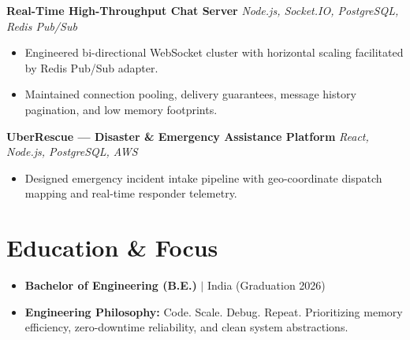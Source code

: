 \documentclass[11pt,a4paper]{article}
\begin{document}
\vspace{3pt}

\textbf{Real-Time High-Throughput Chat Server} \hfill \textit{Node.js, Socket.IO, PostgreSQL, Redis Pub/Sub}
\begin{itemize}[leftmargin=*,itemsep=1pt]
    \item Engineered bi-directional WebSocket cluster with horizontal scaling facilitated by Redis Pub/Sub adapter.
    \item Maintained connection pooling, delivery guarantees, message history pagination, and low memory footprints.
\end{itemize}

\vspace{3pt}

\textbf{UberRescue --- Disaster \& Emergency Assistance Platform} \hfill \textit{React, Node.js, PostgreSQL, AWS}
\begin{itemize}[leftmargin=*,itemsep=1pt]
    \item Designed emergency incident intake pipeline with geo-coordinate dispatch mapping and real-time responder telemetry.
\end{itemize}

\section{Education \& Focus}
\begin{itemize}[leftmargin=*,itemsep=2pt]
    \item \textbf{Bachelor of Engineering (B.E.)} $\vert$ India (Graduation 2026)
    \item \textbf{Engineering Philosophy:} Code. Scale. Debug. Repeat. Prioritizing memory efficiency, zero-downtime reliability, and clean system abstractions.
\end{itemize}
\end{document}
